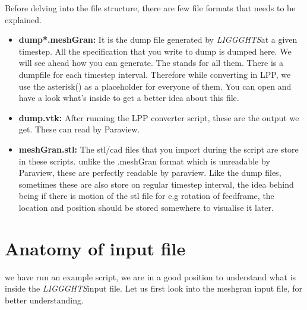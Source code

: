 \documentclass{tufte-book} %
\newcommand{\Li}{\textit{LIGGGHTS}}
\begin{document}
Before delving into the file structure, there are few file formats that needs to be explained.
\begin{itemize}
\item \textbf{dump*.meshGran:} It is the dump file generated by \Li at a given timestep. All the specification that you write to dump is dumped here. We will see ahead how you can generate. The \* stands for all them. There is a dumpfile for each timestep interval. Therefore while converting in LPP, we use the asterisk(\*) as a placeholder for everyone of them.  You can open and have a look what's inside to get a better idea about this file.
\item \textbf{dump.vtk:} After running the LPP converter script, these are the output we get. These can read by Paraview. 
\item \textbf{meshGran.stl:} The stl/cad files that you import during the script are store in these scripts. unlike the .meshGran format which is unreadable by Paraview, these are perfectly readable by paraview. Like the dump files, sometimes these are also store on regular timestep interval, the idea behind being if there is motion of the stl file for e.g rotation of feedframe, the location and position should be stored somewhere to visualise it later. 
\end{itemize}
 \section{Anatomy of input file}

 \begin{fullwidth}
    we have run an example script, we are in a good position to understand what is inside the \Li input file.
   Let us first look into the meshgran input file, for better understanding.
 \end{fullwidth}

 
   
 \inputminted{cpp}{in.meshGran}
   
  
\end{document}
